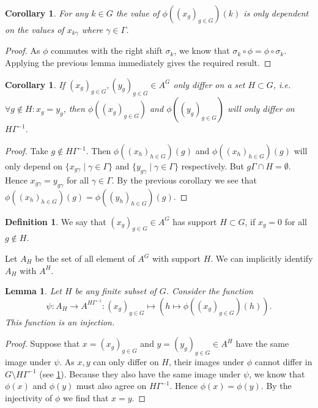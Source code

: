 \documentclass[titlepage, a4paper]{article}
\theoremstyle{theoremdd}
\newtheorem{lemma}[theorem]{Lemma}
\newtheorem{corollary}[theorem]{Corollary}
\theoremstyle{definition}
\newtheorem{definition}[theorem]{Definition}
\theoremstyle{remark}
\begin{document}
\begin{corollary}
	For any $k \in G$ the value of $\phi((x_g)_{g \in G})(k)$ is only dependent on the values of $x_{k\gamma}$ where $\gamma \in \Gamma$.
\end{corollary}	
\begin{proof}
	As $\phi$ commutes with the right shift  $\sigma_k$, we know that $\sigma_k \circ \phi = \phi \circ \sigma_k$. Applying the previous lemma immediately gives the required result.
\end{proof}

\begin{corollary}\label{cor:differ_in_image}
	If $(x_g)_{g \in G}, (y_g)_{g\in G} \in A^{G}$ only differ on a set $H \subset G$, i.e. $\forall g \not\in H:x_g = y_g$,
	then  $\phi((x_g)_{g \in G})$ and $\phi((y_g)_{g \in G})$ will only differ on $H\Gamma^{-1}$.
\end{corollary}
\begin{proof}
	Take $g \not\in H\Gamma^{-1}$. Then $\phi((x_h)_{h \in G})(g)$ and $\phi((x_h)_{h\in G})(g)$ will only depend on  $\{x_{g\gamma}\mid \gamma \in \Gamma\}$ and $\{y_{g\gamma}\mid \gamma \in \Gamma\}$ respectively. But  $g\Gamma \cap H = \emptyset$. Hence $x_{g\gamma} = y_{g\gamma}$ for all $\gamma \in \Gamma$. By the previous corollary we see that $\phi((x_h)_{h \in G})(g) = \phi((y_h)_{h \in G})(g)$.
\end{proof}

\begin{definition}
	We say that $(x_g)_{g \in G} \in A^{G}$ has support $H \subset G$, if $x_g = 0$ for all $g \not\in H$.
\end{definition}
Let $A_H$ be the set of all element of  $A^{G}$ with support $H$. We can implicitly identify $A_H$ with $A^{H}$.

\begin{lemma}\label{lem:injective_restriction}
	Let $H$ be any finite subset of $G$. Consider the function  \[
		\psi:A_H \to A ^{H\Gamma^{-1}}: (x_g)_{g \in G} \mapsto \left(h \mapsto \phi((x_g)_{g \in G})(h)\right)
	.\]  
	This function is an injection. 
\end{lemma}
\begin{proof}
	Suppose that $x= (x_g)_{g \in G}$ and $ y = (y_g)_{g \in G} \in A^{H}$ have the same image under $\psi$. As $x, y$ can only differ on $ H$, their images under $\phi$ cannot differ in $G\setminus H\Gamma^{-1}$ (see \cref{cor:differ_in_image}). Because they also have the same image under $\psi$, we know that $\phi(x)$ and $\phi(y)$ must also agree on $H\Gamma^{-1}$. Hence $\phi(x) = \phi(y)$. By the injectivity of $\phi$ we find that $x = y$.
\end{proof}
\end{document}
